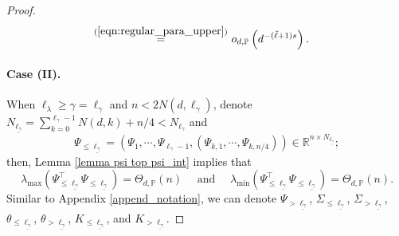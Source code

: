 \documentclass{article}
\theoremstyle{plain}
\theoremstyle{definition}
\theoremstyle{remark}
\begin{document}
\begin{appendix}
\begin{proof}
\begin{equation}
\begin{aligned}
         \overset{(\ref{eqn:regular_para_upper})}{=}&~
         o_{d, \mathbb{P}}\left(   d^{-(\tilde{\ell}+1)s} \right).
    \end{aligned}
\end{equation}

\paragraph{\bf Case (II). } When $\ell_{\lambda} \geq \gamma = \ell_{\gamma}$ and $n < 2N(d, \ell_{\gamma})$,
denote ${N}_{\underline{\ell_{\gamma}}}=\sum_{k=0}^{\ell_{\gamma}-1}N(d,k)+n/4 < N_{\ell_{\gamma}}$ and
$$
\Psi_{\leq {\underline{\ell_{\gamma}}}} = \left(\Psi_{1}, \cdots, \Psi_{\ell_{\gamma}-1}, \left(\Psi_{k,1}, \cdots, \Psi_{k,n/4} \right) \right) \in \mathbb{R}^{n \times {N}_{\underline{\ell_{\gamma}}}};
$$
then, Lemma \ref{lemma psi top psi_int} implies that 
\begin{equation*}
    \lambda_{\text{max}}(\Psi_{\leq \underline{\ell_{\gamma}}}^{\top}\Psi_{\leq \underline{\ell_{\gamma}}}) = \Theta_{d, \mathbb{P}}(n)
    \quad \text{ and } \quad
    \lambda_{\text{min}}(\Psi_{\leq \underline{\ell_{\gamma}}}^{\top}\Psi_{\leq \underline{\ell_{\gamma}}}) = \Theta_{d, \mathbb{P}}(n).
\end{equation*}
Similar to Appendix \ref{append_notation}, we can denote $\Psi_{> {\underline{\ell_{\gamma}}}}$, $\Sigma_{\leq {\underline{\ell_{\gamma}}}}$, $\Sigma_{> {\underline{\ell_{\gamma}}}}$, $\theta_{\leq {\underline{\ell_{\gamma}}}}$, $\theta_{> {\underline{\ell_{\gamma}}}}$, $K_{\leq {\underline{\ell_{\gamma}}}}$, and $K_{> {\underline{\ell_{\gamma}}}}$. 


\end{proof}
\end{appendix}
\end{document}
